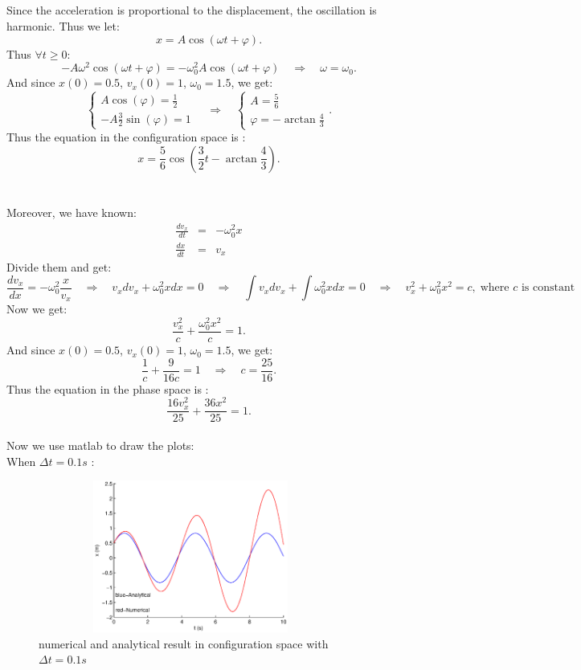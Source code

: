 \documentclass{article}
\begin{document}
\subsection{}
Since the acceleration is proportional to the displacement, the oscillation is harmonic. Thus we let: 
$$x=A\cos(\omega t+\varphi).$$
Thus $\forall t\ge0$:
$$-A\omega^2\cos(\omega t+\varphi)=-\omega_0^2A\cos(\omega t+\varphi)\quad\Rightarrow\quad \omega=\omega_0.$$
And since $x(0)=0.5$, $v_{x}(0)=1$, $\omega_0=1.5$, we get:
$$\left\{\begin{array}{l}
A\cos(\varphi)=\frac{1}{2}\\
-A\frac{3}{2}\sin(\varphi)=1
\end{array}\right. \quad\Rightarrow\quad \left\{\begin{array}{l}
A=\frac{5}{6}\\
\varphi=-\arctan\frac{4}{3}
\end{array}\right..$$
Thus the equation in the configuration space is :
$$x=\frac{5}{6}\cos(\frac{3}{2}t-\arctan\frac{4}{3}).$$
\\
\\Moreover, we have known:
\begin{eqnarray*}
	\frac{dv_x}{dt}&=&-\omega_0^2x \\
	\frac{dx}{dt}&=& v_x
\end{eqnarray*}
Divide them and get:
$$\frac{dv_x}{dx}=-\omega_0^2\frac{x}{v_x}\quad \Rightarrow \quad v_xdv_x+\omega_0^2xdx=0\quad \Rightarrow \quad \int v_xdv_x+\int\omega_0^2xdx=0 \quad \Rightarrow \quad v_x^2+\omega_0^2x^2=c,\;\textrm{where } c \textrm{ is constant}$$
Now we get:
$$\frac{v_x^2}{c}+\frac{\omega_0^2x^2}{c}=1.$$
And since $x(0)=0.5$, $v_{x}(0)=1$, $\omega_0=1.5$, we get:
$$\frac{1}{c}+\frac{9}{16c}=1 \quad \Rightarrow \quad c=\frac{25}{16}.$$
Thus the equation in the phase space is :
$$\frac{16v_x^2}{25}+\frac{36x^2}{25}=1.$$
\\Now we use matlab to draw the plots:
\\When $\Delta t=0.1s$ :
\begin{figure}[!htb]
	\begin{center}
		\includegraphics[height=5cm,width=10cm]{Problem2_1configuration}
	\end{center}
	\caption{numerical and analytical result in configuration space with $\Delta t=0.1s$}
\end{figure}
\end{document}
